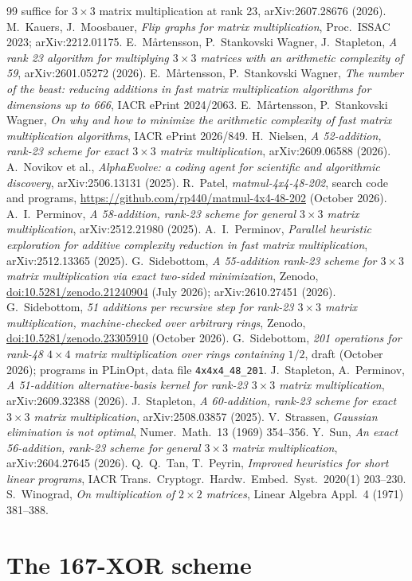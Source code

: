 \documentclass[11pt]{article}
\theoremstyle{remark}
\begin{document}
\begin{thebibliography}{99}
{suffice for $3\times3$ matrix multiplication at rank 23},
arXiv:2607.28676 (2026).
 M.~Kauers, J.~Moosbauer, \emph{Flip graphs for matrix
multiplication}, Proc.\ ISSAC 2023; arXiv:2212.01175.
 E.~M{\aa}rtensson, P.~Stankovski Wagner, J.~Stapleton,
\emph{A rank 23 algorithm for multiplying $3\times3$ matrices with an
arithmetic complexity of 59}, arXiv:2601.05272 (2026).
 E.~M{\aa}rtensson, P.~Stankovski Wagner, \emph{The number
of the beast: reducing additions in fast matrix multiplication
algorithms for dimensions up to 666}, IACR ePrint 2024/2063.
 E.~M{\aa}rtensson, P.~Stankovski Wagner, \emph{On why and
how to minimize the arithmetic complexity of fast matrix multiplication
algorithms}, IACR ePrint 2026/849.
 H.~Nielsen, \emph{A 52-addition, rank-23 scheme for
exact $3\times3$ matrix multiplication}, arXiv:2609.06588 (2026).
 A.~Novikov et al., \emph{AlphaEvolve: a coding agent
for scientific and algorithmic discovery}, arXiv:2506.13131 (2025).
 R.~Patel, \emph{matmul-4x4-48-202}, search code and
programs, \url{https://github.com/rp440/matmul-4x4-48-202} (October
2026).
 A.~I.~Perminov, \emph{A 58-addition, rank-23
scheme for general $3\times3$ matrix multiplication}, arXiv:2512.21980
(2025).
 A.~I.~Perminov, \emph{Parallel heuristic
exploration for additive complexity reduction in fast matrix
multiplication}, arXiv:2512.13365 (2025).
 G.~Sidebottom, \emph{A 55-addition rank-23
scheme for $3\times3$ matrix multiplication via exact two-sided
minimization}, Zenodo,
\href{https://doi.org/10.5281/zenodo.21240904}{doi:10.5281/zenodo.21240904}
(July 2026); arXiv:2610.27451 (2026).
 G.~Sidebottom, \emph{51 additions per recursive
step for rank-23 $3\times3$ matrix multiplication, machine-checked over
arbitrary rings}, Zenodo,
\href{https://doi.org/10.5281/zenodo.23305910}{doi:10.5281/zenodo.23305910}
(October 2026).
 G.~Sidebottom, \emph{201 operations for rank-48
$4\times4$ matrix multiplication over rings containing $1/2$}, draft
(October 2026); programs in PLinOpt, data file \texttt{4x4x4\_48\_201}.
 J.~Stapleton, A.~Perminov, \emph{A 51-addition
alternative-basis kernel for rank-23 $3\times3$ matrix
multiplication}, arXiv:2609.32388 (2026).
 J.~Stapleton, \emph{A 60-addition, rank-23 scheme
for exact $3\times3$ matrix multiplication}, arXiv:2508.03857 (2025).
 V.~Strassen, \emph{Gaussian elimination is not
optimal}, Numer.\ Math.\ 13 (1969) 354--356.
 Y.~Sun, \emph{An exact 56-addition, rank-23 scheme for
general $3\times3$ matrix multiplication}, arXiv:2604.27645 (2026).
 Q.~Q.~Tan, T.~Peyrin, \emph{Improved heuristics for short
linear programs}, IACR Trans.\ Cryptogr.\ Hardw.\ Embed.\ Syst.\
2020(1) 203--230.
 S.~Winograd, \emph{On multiplication of $2\times2$
matrices}, Linear Algebra Appl.\ 4 (1971) 381--388.
\end{thebibliography}

\appendix
\section{The 167-XOR scheme}\label{app:scheme}

\end{document}
